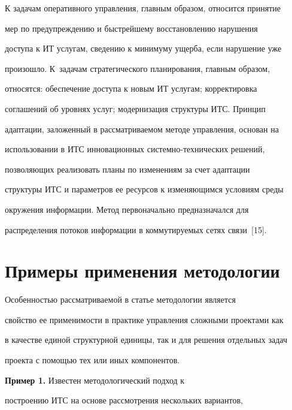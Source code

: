 К задачам оперативного управления, главным образом, относится принятие 


мер по предупреждению и быстрейшему восстановлению нарушения 


доступа к ИТ услугам, сведению к минимуму ущерба, если нарушение уже 


произошло. К~задачам стратегического планирования, главным образом, 


относятся: обеспечение доступа к новым ИТ услугам; корректировка 


соглашений об уровнях услуг; модернизация структуры ИТС. Принцип 


адаптации, заложенный в рассматриваемом методе управления, основан на 


использовании в ИТС инновационных сис\-тем\-но-тех\-ни\-че\-ских решений, 


позволяющих реализовать планы по изменениям за счет адаптации 


структуры ИТС и параметров ее ресурсов к изменяющимся условиям среды 


окружения информации. Метод первоначально предназначался для 


распределения потоков информации в коммутируемых сетях связи~[15].


        


        \section{Примеры применения методологии}


        


        Особенностью рассматриваемой в статье методологии является 


свойство ее применимости в практике управления сложными проектами как 


в качестве единой структурной единицы, так и для решения отдельных задач 


проекта с помощью тех или иных компонентов. 


        


        \medskip


        


        \noindent


        \textbf{Пример 1.} Известен методологический подход к 


построению ИТС на основе рассмотрения нескольких вариантов, 


